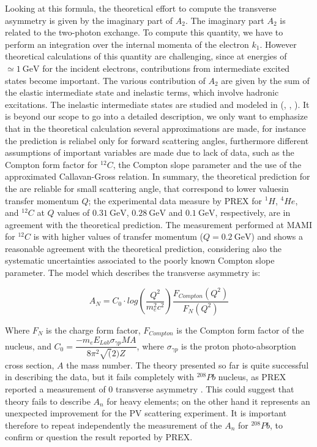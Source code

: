 Looking at this formula, the theoretical effort to compute the transverse asymmetry is given by the imaginary part of $A_{2}$. The imaginary part $A_{2}$ is related to the two-photon exchange. To compute this quantity, we have to perform an integration over the internal momenta of the electron $k_{1}$. However theoretical calculations of this quantity are challenging, since at energies of $\simeq \SI{1}{\giga \electronvolt}$ for the incident electrons, contributions from intermediate excited states become important. The various contribution of $A_{2}$ are given by the sum of the elastic intermediate state and inelastic terms, which involve hadronic excitations.
The inelastic intermediate states are studied and modeled in (\cite{Gorchtein_2006}, \cite{Gorchtein_2008}, \cite{Koshchii_2021}). It is beyond our scope to go into a detailed description, we only want to emphasize that in the theoretical calculation several approximations are made, for instance the prediction is reliabel only for forward scattering angles, furthermore different assumptions of important variables are made due to lack of data, such as the Compton form factor for $^{12}C$, the Compton slope parameter and the use of the approximated Callavan-Gross relation. 
In summary, the theoretical prediction for the \transv are reliable for small scattering angle, that correspond to lower values ​​in transfer momentum $Q$; the experimental data measure by PREX \cite{HAPPEX:2012fud} for $^{1}H$, $^{4}He$, and $^{12}C$ at $Q$ values of $\SI{0.31}{\giga \electronvolt}$, $\SI{0.28}{\giga \electronvolt}$ and $\SI{0.1}{\giga \electronvolt}$, respectively, are in agreement with the theoretical prediction. The measurement performed at MAMI for $^{12}C$ \cite{Esser:2018vdp} is with higher values of transfer momentum ($Q = \SI{0.2}{\giga \electronvolt}$) and shows a reasonable agreement with the theoretical prediction, considering also the systematic uncertainties associated to the poorly known Compton slope parameter. The model which describes the transverse asymmetry is:

\begin{equation}
A_{N} = C_{0} \cdot log(\dfrac{Q^{2}}{m_{e}^{2} c^{2}}) \dfrac{F_{Compton}(Q^{2})}{F_{N}(Q^{2})}
\end{equation}

Where $F_{N}$ is the charge form factor, $F_{Compton}$ is the Compton form factor of the nucleus, and $C_{0} = \dfrac{- m_{e} E_{Lab} \sigma_{\gamma p} M A}{8 \pi^{2} \sqrt(2) Z}$, where $\sigma_{\gamma p}$ is the proton photo-absorption cross section, $A$ the mass number. 
The theory presented so far is quite successful in describing the data, but it fails completely with $^{208}Pb$ nucleus, as PREX reported a measurement of $0$ transverse asymmetry \cite{HAPPEX:2012fud}. This could suggest that theory fails to describe $A_{n}$ for heavy elements; on the other hand it represents an unexpected improvement for the PV scattering experiment. It is important therefore to repeat independently the measurement of the $A_{n}$ for $^{208}Pb$, to confirm or question the result reported by PREX.

